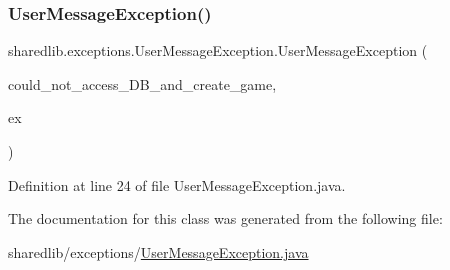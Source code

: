 \subsubsection{\texorpdfstring{User\+Message\+Exception()}{UserMessageException()}\hspace{0.1cm}{\footnotesize\ttfamily [2/2]}}
{\footnotesize\ttfamily sharedlib.\+exceptions.\+User\+Message\+Exception.\+User\+Message\+Exception (\begin{DoxyParamCaption}\item[{String}]{could\+\_\+not\+\_\+access\+\_\+\+D\+B\+\_\+and\+\_\+create\+\_\+game,  }\item[{S\+Q\+L\+Exception}]{ex }\end{DoxyParamCaption})}



Definition at line 24 of file User\+Message\+Exception.\+java.



The documentation for this class was generated from the following file\+:\begin{DoxyCompactItemize}
\item 
sharedlib/exceptions/\hyperlink{_user_message_exception_8java}{User\+Message\+Exception.\+java}\end{DoxyCompactItemize}
